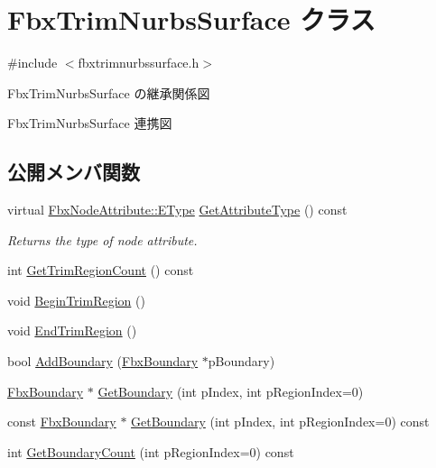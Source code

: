 \hypertarget{class_fbx_trim_nurbs_surface}{}\section{Fbx\+Trim\+Nurbs\+Surface クラス}
\label{class_fbx_trim_nurbs_surface}


{\ttfamily \#include $<$fbxtrimnurbssurface.\+h$>$}



Fbx\+Trim\+Nurbs\+Surface の継承関係図


Fbx\+Trim\+Nurbs\+Surface 連携図
\subsection*{公開メンバ関数}
\begin{DoxyCompactItemize}
\item 
virtual \hyperlink{class_fbx_node_attribute_a08e1669d3d1a696910756ab17de56d6a}{Fbx\+Node\+Attribute\+::\+E\+Type} \hyperlink{class_fbx_trim_nurbs_surface_a2d60f9613978db561ac32e2efff35104}{Get\+Attribute\+Type} () const
\begin{DoxyCompactList}\small\item\em Returns the type of node attribute. \end{DoxyCompactList}\item 
int \hyperlink{class_fbx_trim_nurbs_surface_af9deaac6001549449325ca4112e3a58a}{Get\+Trim\+Region\+Count} () const
\item 
void \hyperlink{class_fbx_trim_nurbs_surface_aaec68af89d01b7f4bd76c2ec5e3eb837}{Begin\+Trim\+Region} ()
\item 
void \hyperlink{class_fbx_trim_nurbs_surface_a3490479b6c5121b3755c06d7d604c4b9}{End\+Trim\+Region} ()
\item 
bool \hyperlink{class_fbx_trim_nurbs_surface_ab1b07cf42bbc5ac750aaed3012ebeec6}{Add\+Boundary} (\hyperlink{class_fbx_boundary}{Fbx\+Boundary} $\ast$p\+Boundary)
\item 
\hyperlink{class_fbx_boundary}{Fbx\+Boundary} $\ast$ \hyperlink{class_fbx_trim_nurbs_surface_af42e403f540581bee858f76fbd39f6b5}{Get\+Boundary} (int p\+Index, int p\+Region\+Index=0)
\item 
const \hyperlink{class_fbx_boundary}{Fbx\+Boundary} $\ast$ \hyperlink{class_fbx_trim_nurbs_surface_a64eb1c82eb77f8e48a7da4ecea7c1f81}{Get\+Boundary} (int p\+Index, int p\+Region\+Index=0) const
\item 
int \hyperlink{class_fbx_trim_nurbs_surface_a95faf8ef0f87e4a329a7a7c0340dbd99}{Get\+Boundary\+Count} (int p\+Region\+Index=0) const

\end{DoxyCompactItemize}
